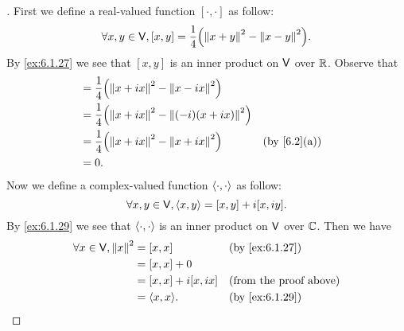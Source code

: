 \begin{proof}[]
  First we define a real-valued function \([\cdot, \cdot]\) as follow:
  \[
    \forall x, y \in \V, [x, y] = \frac{1}{4} \pa{\norm{x + y}^2 - \norm{x - y}^2}.
  \]
  By \cref{ex:6.1.27} we see that \([x, y]\) is an inner product on \(\mathsf{V}\) over \(\mathbb{R}\).
  Observe that
  \begin{align*}
    [x, ix] & = \frac{1}{4} \pa{\norm{x + ix}^2 - \norm{x - ix}^2}                         \\
            & = \frac{1}{4} \pa{\norm{x + ix}^2 - \norm{(-i) (x + ix)}^2}                  \\
            & = \frac{1}{4} \pa{\norm{x + ix}^2 - \norm{x + ix}^2}        &  & \by{6.2}[a] \\
            & = 0.
  \end{align*}
  Now we define a complex-valued function \(\left\langle\cdot, \cdot\right\rangle\) as follow:
  \[
    \forall x, y \in \mathsf{V}, \left\langle x, y\right\rangle = [x, y] + i[x, iy].
  \]
  By \cref{ex:6.1.29} we see that \(\left\langle\cdot, \cdot\right\rangle\) is an inner product on \(\mathsf{V}\) over \(\mathbb{C}\).
  Then we have
  \begin{align*}
    \forall x \in \V, \norm{x}^2 & = [x, x]            &  & \by{ex:6.1.27}                \\
                                 & = [x, x] + 0                                           \\
                                 & = [x, x] + i[x, ix] &  & \text{(from the proof above)} \\
                                 & = \inn{x, x}.       &  & \by{ex:6.1.29}
  \end{align*}
\end{proof}
